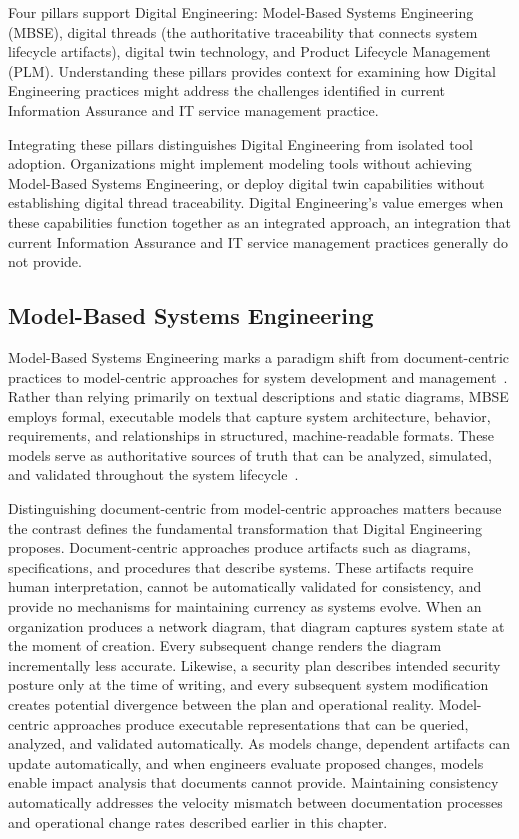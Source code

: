 Four pillars support Digital Engineering: Model-Based Systems Engineering (MBSE), digital threads (the authoritative traceability that connects system lifecycle artifacts), digital twin technology, and Product Lifecycle Management (PLM). Understanding these pillars provides context for examining how Digital Engineering practices might address the challenges identified in current Information Assurance and IT service management practice.

Integrating these pillars distinguishes Digital Engineering from isolated tool adoption. Organizations might implement modeling tools without achieving Model-Based Systems Engineering, or deploy digital twin capabilities without establishing digital thread traceability. Digital Engineering's value emerges when these capabilities function together as an integrated approach, an integration that current Information Assurance and IT service management practices generally do not provide.

\subsection{Model-Based Systems Engineering}

Model-Based Systems Engineering marks a paradigm shift from document-centric practices to model-centric approaches for system development and management~\parencite{Hutchison_2020}. Rather than relying primarily on textual descriptions and static diagrams, MBSE employs formal, executable models that capture system architecture, behavior, requirements, and relationships in structured, machine-readable formats. These models serve as authoritative sources of truth that can be analyzed, simulated, and validated throughout the system lifecycle~\parencite{Hutchinson_2021}.

Distinguishing document-centric from model-centric approaches matters because the contrast defines the fundamental transformation that Digital Engineering proposes. Document-centric approaches produce artifacts such as diagrams, specifications, and procedures that describe systems. These artifacts require human interpretation, cannot be automatically validated for consistency, and provide no mechanisms for maintaining currency as systems evolve. When an organization produces a network diagram, that diagram captures system state at the moment of creation. Every subsequent change renders the diagram incrementally less accurate. Likewise, a security plan describes intended security posture only at the time of writing, and every subsequent system modification creates potential divergence between the plan and operational reality. Model-centric approaches produce executable representations that can be queried, analyzed, and validated automatically. As models change, dependent artifacts can update automatically, and when engineers evaluate proposed changes, models enable impact analysis that documents cannot provide. Maintaining consistency automatically addresses the velocity mismatch between documentation processes and operational change rates described earlier in this chapter.

